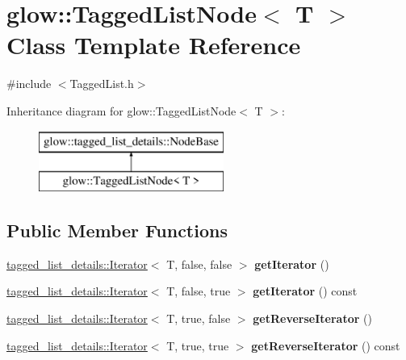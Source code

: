 \hypertarget{classglow_1_1_tagged_list_node}{}\section{glow\+:\+:Tagged\+List\+Node$<$ T $>$ Class Template Reference}
\label{classglow_1_1_tagged_list_node}


{\ttfamily \#include $<$Tagged\+List.\+h$>$}

Inheritance diagram for glow\+:\+:Tagged\+List\+Node$<$ T $>$\+:\begin{figure}[H]
\begin{center}
\leavevmode
\includegraphics[height=2.000000cm]{classglow_1_1_tagged_list_node}
\end{center}
\end{figure}
\subsection*{Public Member Functions}
\begin{DoxyCompactItemize}
\item 
\mbox{\label{classglow_1_1_tagged_list_node_a0d2b3086355bb940de160197ccc083a3}} 
\hyperlink{classglow_1_1tagged__list__details_1_1_iterator}{tagged\+\_\+list\+\_\+details\+::\+Iterator}$<$ T, false, false $>$ {\bfseries get\+Iterator} ()
\item 
\mbox{\label{classglow_1_1_tagged_list_node_a83f6e8871585d13da351108fc322060e}} 
\hyperlink{classglow_1_1tagged__list__details_1_1_iterator}{tagged\+\_\+list\+\_\+details\+::\+Iterator}$<$ T, false, true $>$ {\bfseries get\+Iterator} () const
\item 
\mbox{\label{classglow_1_1_tagged_list_node_aa06d3205141512e585d1877fe2937f14}} 
\hyperlink{classglow_1_1tagged__list__details_1_1_iterator}{tagged\+\_\+list\+\_\+details\+::\+Iterator}$<$ T, true, false $>$ {\bfseries get\+Reverse\+Iterator} ()
\item 
\mbox{\label{classglow_1_1_tagged_list_node_a6fab45b6acfb4c73ff7bc92b60f27a9f}} 
\hyperlink{classglow_1_1tagged__list__details_1_1_iterator}{tagged\+\_\+list\+\_\+details\+::\+Iterator}$<$ T, true, true $>$ {\bfseries get\+Reverse\+Iterator} () const
\end{DoxyCompactItemize}


